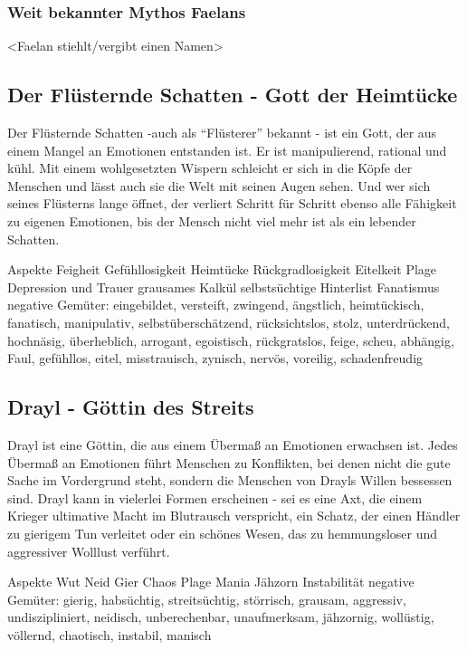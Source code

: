 \subsubsection{Weit bekannter Mythos Faelans}
<Faelan stiehlt/vergibt einen Namen> 





\subsection{Der Flüsternde Schatten - Gott der Heimtücke}
Der Flüsternde Schatten -auch als ``Flüsterer'' bekannt - ist ein Gott, der aus einem Mangel an Emotionen entstanden ist.
Er ist manipulierend, rational und kühl. 
Mit einem wohlgesetzten Wispern schleicht er sich in die Köpfe der Menschen und lässt auch sie die Welt mit seinen Augen sehen. 
Und wer sich seines Flüsterns lange öffnet, der verliert Schritt für Schritt ebenso alle Fähigkeit zu eigenen Emotionen, bis der Mensch nicht viel mehr ist als ein lebender Schatten.
\begin{outline}
	\1 Aspekte
		\2 Feigheit
		\2 Gefühllosigkeit
		\2 Heimtücke
		\2 Rückgradlosigkeit
		\2 Eitelkeit
	\1 Plage
		\2 Depression und Trauer
		\2 grausames Kalkül
		\2 selbstsüchtige Hinterlist
		\2 Fanatismus
	\1 negative Gemüter: eingebildet, versteift, zwingend, ängstlich, heimtückisch, fanatisch, manipulativ, selbstüberschätzend, rücksichtslos, stolz, unterdrückend, hochnäsig,
	überheblich, arrogant, egoistisch, rückgratslos, feige, scheu, abhängig, Faul, gefühllos, eitel, misstrauisch, zynisch, nervös, voreilig, schadenfreudig
\end{outline}




\subsection{Drayl - Göttin des Streits}
Drayl ist eine Göttin, die aus einem Übermaß an Emotionen erwachsen ist. 
Jedes Übermaß an Emotionen führt Menschen zu Konflikten, bei denen nicht die gute Sache im Vordergrund steht, sondern die Menschen von Drayls Willen bessessen sind.
Drayl kann in vielerlei Formen erscheinen - sei es eine Axt, die einem Krieger ultimative Macht im Blutrausch verspricht, ein Schatz, der einen Händler zu gierigem Tun verleitet oder ein schönes Wesen, das zu hemmungsloser und aggressiver Wolllust verführt.

\begin{outline}
	\1 Aspekte
		\2 Wut
		\2 Neid
		\2 Gier
		\2 Chaos
	\1 Plage
		\2 Mania
		\2 Jähzorn
		\2 Instabilität
	\1 negative Gemüter: gierig,  habsüchtig,  streitsüchtig, störrisch, grausam, aggressiv, undiszipliniert, neidisch, unberechenbar, unaufmerksam, jähzornig, wollüstig, völlernd, 
	chaotisch, instabil, manisch
\end{outline}




